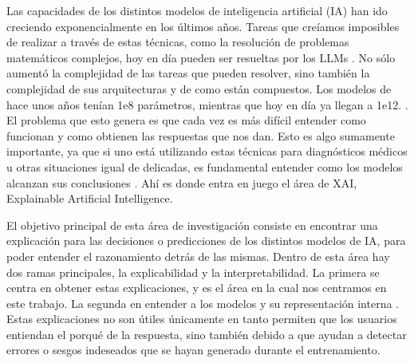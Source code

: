 Las capacidades de los distintos modelos de inteligencia artificial (IA) han ido creciendo exponencialmente en los últimos años. Tareas que creíamos imposibles de realizar a través de estas técnicas, como la resolución de problemas matemáticos complejos, hoy en día pueden ser resueltas por los LLMs \cite{frontierMath}. No sólo aumentó la complejidad de las tareas que pueden resolver, sino también la complejidad de sus arquitecturas y de como están compuestos. Los modelos de hace unos años tenían 1e8 parámetros, mientras que hoy en día ya llegan a 1e12. \cite{EpochLargeScaleModels2024}. El problema que esto genera es que cada vez es más difícil entender como funcionan y como obtienen las respuestas que nos dan. Esto es algo sumamente importante, ya que si uno está utilizando estas técnicas para diagnósticos médicos u otras situaciones igual de delicadas, es fundamental  entender como los modelos alcanzan sus conclusiones . Ahí es donde entra en juego el área de XAI, Explainable Artificial Intelligence.

El objetivo principal de esta área de investigación consiste en encontrar una explicación para las decisiones o predicciones de los distintos modelos de IA, para poder entender el razonamiento detrás de las mismas. Dentro de esta área hay dos ramas principales, la explicabilidad y la interpretabilidad. La primera se centra en obtener estas explicaciones, y es el área en la cual nos centramos en este trabajo. La segunda en entender a los modelos y su representación interna \cite{interpretabilityPaper}. Estas explicaciones no son útiles únicamente en tanto permiten que los usuarios entiendan el porqué de la respuesta, sino también debido a que ayudan a detectar errores o sesgos indeseados que se hayan generado durante el entrenamiento. 

